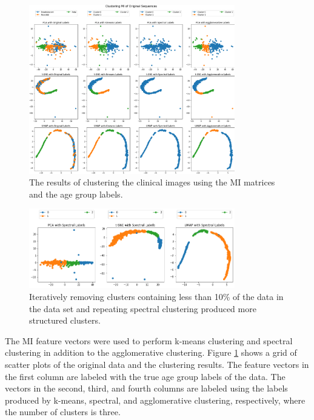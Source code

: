 \begin{figure}
\centering
\includegraphics[width=0.8\textwidth]{6/figures/bold-mi-agegroup.png}
\caption{The results of clustering the clinical images using the MI matrices and the age group labels.}
\label{fig:mocha-ages-mi-bold}
\end{figure}

\begin{figure}
\centering
\includegraphics[width=0.8\textwidth]{6/figures/spectral-revised.png}
\caption{Iteratively removing clusters containing less than 10\% of the data in the data set and repeating spectral clustering produced more structured clusters.}
\label{fig:spectral-revised}
\end{figure}

The MI feature vectors were used to perform k-means clustering and spectral clustering in addition to the agglomerative clustering. Figure \ref{fig:mocha-ages-mi-bold} shows a grid of scatter plots of the original data and the clustering results. The feature vectors in the first column are labeled with the true age group labels of the data. The vectors in the second, third, and fourth columns are labeled using the labels produced by k-means, spectral, and agglomerative clustering, respectively, where the number of clusters is three. 


